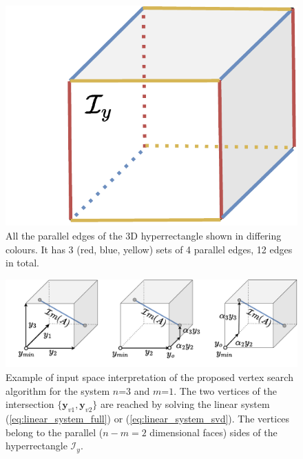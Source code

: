 \begin{figure}
    \centering
    \includegraphics[width=\linewidth]{Papers/images/parallel.pdf}
    \caption{All the parallel edges of the 3D hyperrectangle shown in differing colours. It has 3 (red, blue, yellow) sets of 4 parallel edges, 12 edges in total.}
    \label{fig:parallel}
\end{figure}

\begin{figure}[!t]
    \centering
    \includegraphics[width=0.9\linewidth]{Papers/images/intersection_example.pdf}
    \caption{Example of input space interpretation of the proposed vertex search algorithm for the system $n$=$3$ and $m$=$1$. The two vertices of the intersection $\{\bm{y}_{v1},\bm{y}_{v2}\}$ are reached by solving the linear system (\ref{eq:linear_system_full}) or (\ref{eq:linear_system_svd}). The vertices belong to the parallel ($n\!-\!m\!=\!2$ dimensional faces) sides of the hyperrectangle $\mathcal{I}_y$.  }
    \label{fig:intersection_example}
\end{figure}

